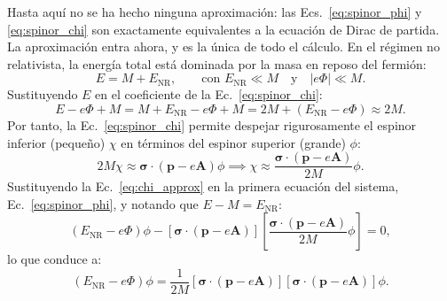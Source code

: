 \documentclass[10pt,a4paper]{article}
\begin{document}
Hasta aquí no se ha hecho ninguna aproximación: las Ecs.~\eqref{eq:spinor_phi} y \eqref{eq:spinor_chi} son exactamente equivalentes a la ecuación de Dirac de partida. La aproximación entra ahora, y es la única de todo el cálculo. En el régimen no relativista, la energía total está dominada por la masa en reposo del fermión:
\begin{equation}
E = M + E_{\text{NR}}, \qquad \text{con } E_{\text{NR}} \ll M \quad \text{y} \quad |e\Phi| \ll M.
\end{equation}
Sustituyendo $E$ en el coeficiente de la Ec.~\eqref{eq:spinor_chi}:
\begin{equation}
E - e\Phi + M = M + E_{\text{NR}} - e\Phi + M = 2M + (E_{\text{NR}} - e\Phi) \approx 2M.
\end{equation}
Por tanto, la Ec.~\eqref{eq:spinor_chi} permite despejar rigurosamente el espinor inferior (pequeño) $\chi$ en términos del espinor superior (grande) $\phi$:
\begin{equation}
2M \chi \approx \boldsymbol{\sigma} \cdot (\mathbf{p} - e\mathbf{A}) \phi \implies \chi \approx \frac{\boldsymbol{\sigma} \cdot (\mathbf{p} - e\mathbf{A})}{2M} \phi.
\label{eq:chi_approx}
\end{equation}
Sustituyendo la Ec.~\eqref{eq:chi_approx} en la primera ecuación del sistema, Ec.~\eqref{eq:spinor_phi}, y notando que $E - M = E_{\text{NR}}$:
\begin{equation}
(E_{\text{NR}} - e\Phi)\phi - [\boldsymbol{\sigma} \cdot (\mathbf{p} - e\mathbf{A})] \left[ \frac{\boldsymbol{\sigma} \cdot (\mathbf{p} - e\mathbf{A})}{2M} \phi \right] = 0,
\end{equation}
lo que conduce a:
\begin{equation}
(E_{\text{NR}} - e\Phi)\phi = \frac{1}{2M} \left[ \boldsymbol{\sigma} \cdot (\mathbf{p} - e\mathbf{A}) \right] \left[ \boldsymbol{\sigma} \cdot (\mathbf{p} - e\mathbf{A}) \right] \phi.
\label{eq:pauli_eq_step1}
\end{equation}
\end{document}
